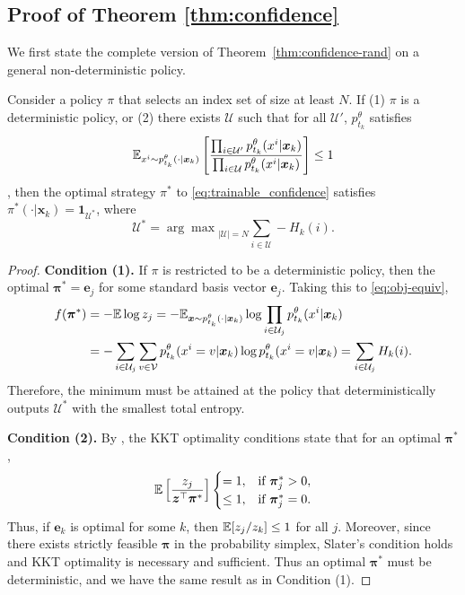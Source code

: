 \subsection{Proof of Theorem \ref{thm:confidence}}\label{subsec:proof-confidence}
We first state the complete version of Theorem~\ref{thm:confidence-rand} on a general non-deterministic policy.
\begin{theorem}
    \label{thm:confidence-complete}
     Consider a policy $\pi$ that selects an index set of size at least $N$. 
     If (1) $\pi$ is a deterministic policy, or (2) there exists $\mathcal U$ such that for all $\mathcal U'$, $p_{t_k}^\theta$ satisfies
     \begin{align*}
         \mathbb{E}_{x^i\sim p_{t_k}^\theta(\cdot|\bm x_k)}\left[\frac{\prod_{i\in\mathcal U'}p_{t_k}^\theta(x^i|\bm x_k)}{\prod_{i\in\mathcal U}p_{t_k}^\theta(x^i|\bm x_k)}\right]\leq 1
     \end{align*}
    , then the optimal strategy $\pi^*$ to \eqref{eq:trainable_confidence} satisfies $\pi^*(\cdot|\bm x_k)=\mathbf1_{\mathcal U^*}$, where
     $$\mathcal U^*={\arg\max}_{|\mathcal U|=N}\sum_{i\in\mathcal U}-H_k(i).$$
\end{theorem}
\begin{proof}
\textbf{Condition (1).} If $\pi$ is restricted to be a deterministic policy, then the optimal $\bm\pi^*=\bm e_j$ for some standard basis vector $\bm e_j$. Taking this to \eqref{eq:obj-equiv}, 
\begin{align*}
f(\bm\pi^*)&=-\mathbb{E}\log z_j=-\mathbb{E}_{\bm x\sim p_{t_k}^\theta(\cdot|\bm x_k)}\log\prod_{i\in\mathcal U_j}p_{t_k}^\theta(x^i|\bm x_k)\\
&=-\sum_{i\in\mathcal U_j}\sum_{v\in\mathcal V} p_{t_k}^\theta(x^i=v|\bm x_k)\log p_{t_k}^\theta(x^i=v|\bm x_k)=\sum_{i\in\mathcal U_j}H_k(i).
\end{align*}
Therefore, the minimum must be attained at the policy that deterministically outputs $\mathcal U^*$ with the smallest total entropy.

\textbf{Condition (2).} By \citet{cover1987log}, the KKT optimality conditions state that for an optimal $\bm\pi^*$,
\begin{align*}
    \mathbb{E}\left[\frac{z_j}{\bm z^\top\bm\pi^*}\right]\begin{cases}
        =1,&\text{if }\bm\pi^*_j>0,\\
        \leq1,&\text{if }\bm\pi^*_j=0.
    \end{cases}
\end{align*}
Thus, if $\bm e_k$ is optimal for some $k$, then $\mathbb{E}[z_j/z_k]\leq1$ for all $j$. Moreover, since there exists strictly feasible $\bm\pi$ in the probability simplex, Slater's condition holds and KKT optimality is necessary and sufficient. Thus an optimal $\bm\pi^*$ must be deterministic, and we have the same result as in Condition (1).

\end{proof}


